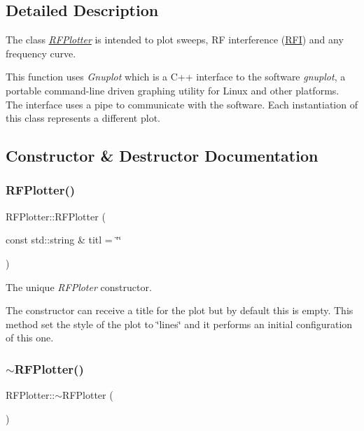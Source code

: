 \subsection{Detailed Description}
The class {\itshape \hyperlink{classRFPlotter}{R\+F\+Plotter}} is intended to plot sweeps, RF interference (\hyperlink{structRFI}{R\+FI}) and any frequency curve. 

This function uses {\itshape Gnuplot} which is a C++ interface to the software {\itshape gnuplot}, a portable command-\/line driven graphing utility for Linux and other platforms. The interface uses a pipe to communicate with the software. Each instantiation of this class represents a different plot. 

\subsection{Constructor \& Destructor Documentation}
\mbox{\label{classRFPlotter_af6924d7315d5c41390be12c329566579}} 
\subsubsection{\texorpdfstring{R\+F\+Plotter()}{RFPlotter()}}
{\footnotesize\ttfamily R\+F\+Plotter\+::\+R\+F\+Plotter (\begin{DoxyParamCaption}\item[{const std\+::string \&}]{titl = {\ttfamily \char`\"{}\char`\"{}} }\end{DoxyParamCaption})\hspace{0.3cm}{\ttfamily [inline]}}



The unique {\itshape R\+F\+Ploter} constructor. 

The constructor can receive a title for the plot but by default this is empty. This method set the style of the plot to \char`\"{}lines\char`\"{} and it performs an initial configuration of this one. \mbox{\label{classRFPlotter_aa69fbeac640e9f9ee545dbe2f1e3b3d7}} 
\subsubsection{\texorpdfstring{$\sim$\+R\+F\+Plotter()}{~RFPlotter()}}
{\footnotesize\ttfamily R\+F\+Plotter\+::$\sim$\+R\+F\+Plotter (\begin{DoxyParamCaption}{ }\end{DoxyParamCaption})\hspace{0.3cm}{\ttfamily [inline]}}



